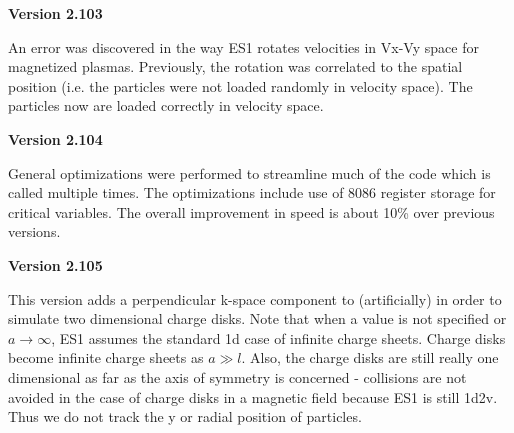 \begin{section}
\begin{subsection}
\begin{subsubsection}
{\bf Version 2.103}

      An error was discovered in the way ES1 rotates velocities in Vx-Vy space
      for magnetized plasmas.  Previously, the rotation was correlated to the
      spatial position (i.e. the particles were not loaded randomly in velocity
      space).  The particles now are loaded correctly in velocity space.
\end{subsubsection}

\begin{subsubsection}
{\bf Version 2.104}

      General optimizations were performed to streamline much of the code which
      is called multiple times.  The optimizations include use of 8086 register
      storage for critical variables.  The overall improvement in speed is
      about 10\% over previous versions.
\end{subsubsection}

\begin{subsubsection}
{\bf Version 2.105}

      This version adds a perpendicular k-space component to (artificially) in order to
      simulate two dimensional charge disks.  Note that when a value is not
      specified or $a \rightarrow \infty$, ES1 assumes the standard 1d case of infinite charge
      sheets.  Charge disks become infinite charge sheets as $a \gg l$.
      Also, the
      charge disks are still really one dimensional as far as the axis of
      symmetry is concerned - collisions are not avoided in the case of charge
      disks in a magnetic field because ES1 is still 1d2v.  Thus we do not
      track the y or radial position of particles.
\vspace{.2in}


\end{subsubsection}
\end{subsection}
\end{section}
